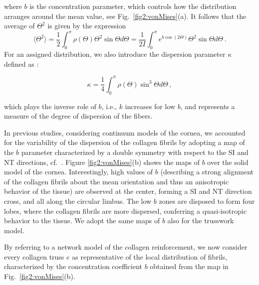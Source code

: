 \documentclass[preprint,12pt]{elsarticle}
\begin{document}
where $b$ is the concentration parameter, which controls how the distribution arranges around the mean value, see Fig.~\ref{fig2:vonMises}(a). It follows that the average of $\Theta^2$ is given by the expression
$$ 
	\langle \Theta^2 \rangle = \dfrac{1}{2} \int_0^\pi \rho( \Theta) \Theta^2 \sin \Theta d \Theta =
	\dfrac{1}{2 I} \int_0^\pi  e^{b\cos(2 \Theta)} \Theta^2 \sin \Theta d \Theta	\, .
$$
For an assigned distribution, we also introduce the dispersion parameter $\kappa$ defined as \cite{pandolfi2012fiber}:
\begin{linenomath}
\begin{equation}
	\kappa
	=
	\dfrac{1}{4} \int_0^\pi \rho( \Theta) \sin^3 \Theta d \Theta \, , 
   \label{eq:9}
\end{equation}
\end{linenomath}
which plays the inverse role of $b$, i.e., $k$ increases for low $b$, and represents a measure of the degree of dispersion of the fibers.

In previous studies, considering continuum models of the cornea, we accounted for the variability of the dispersion of the collagen fibrils by adopting a map of the $b$ parameter characterized by a double symmetry with respect to the SI and NT directions, cf.~\cite{pandolfi2012fiber}. Figure \ref{fig2:vonMises}(b) shows the maps of $b$ over the solid model of the cornea. Interestingly, high values of $b$ (describing a strong alignment of the collagen fibrils about the mean orientation and thus an anisotropic behavior of the tissue) are observed at the center, forming a SI and NT direction cross, and all along the circular limbus. The low $b$ zones are disposed to form four lobes, where the collagen fibrils are more dispersed, conferring a quasi-isotropic behavior to the tissue. We adopt the same maps of $b$ also for the trusswork model.

By referring to a network model of the collagen reinforcement, we now consider every collagen truss $e$ as representative of the local distribution of fibrils, characterized by the concentration coefficient $b$ obtained from the map in Fig.~\ref{fig2:vonMises}(b).
\end{document}
